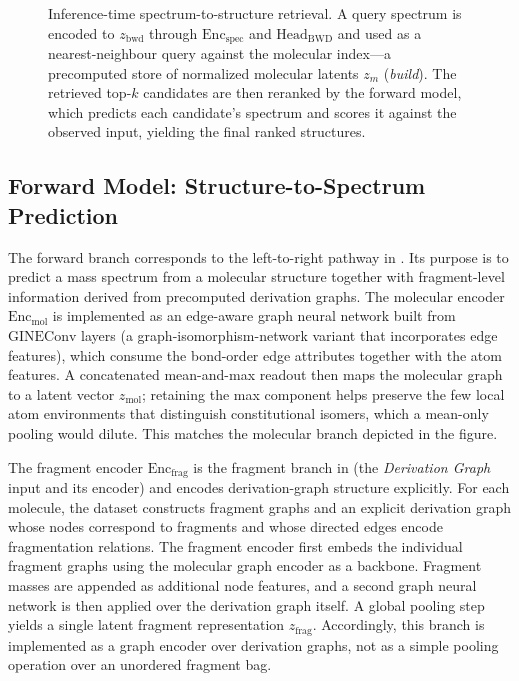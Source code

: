 \begin{figure}[H]
    \centering
    \resizebox{\textwidth}{!}{
        
    }
    \caption[Inference and retrieval]{
        Inference-time spectrum-to-structure retrieval.
        A query spectrum is encoded to $z_{\mathrm{bwd}}$ through $\text{Enc}_{\mathrm{spec}}$ and $\text{Head}_{\mathrm{BWD}}$ and used as a nearest-neighbour query against the molecular index---a precomputed store of normalized molecular latents $z_m$ (\emph{build}).
        The retrieved top-$k$ candidates are then reranked by the forward model, which predicts each candidate's spectrum and scores it against the observed input, yielding the final ranked structures.
    }
    \label{fig:ml-architecture-inference}
\end{figure}




\subsection{Forward Model: Structure-to-Spectrum Prediction}
\label{sec:forward-model}

The forward branch corresponds to the left-to-right pathway in .
Its purpose is to predict a mass spectrum from a molecular structure together with fragment-level information derived from precomputed derivation graphs.
The molecular encoder $\mathrm{Enc}_{\mathrm{mol}}$ is implemented as an edge-aware graph neural network built from $\mathrm{GINEConv}$ layers (a graph-isomorphism-network variant that incorporates edge features), which consume the bond-order edge attributes together with the atom features.
A concatenated mean-and-max readout then maps the molecular graph to a latent vector $z_{\mathrm{mol}}$; retaining the max component helps preserve the few local atom environments that distinguish constitutional isomers, which a mean-only pooling would dilute.
This matches the molecular branch depicted in the figure.

The fragment encoder $\mathrm{Enc}_{\mathrm{frag}}$ is the fragment branch in  (the \emph{Derivation Graph} input and its encoder) and encodes derivation-graph structure explicitly.
For each molecule, the dataset constructs fragment graphs and an explicit derivation graph whose nodes correspond to fragments and whose directed edges encode fragmentation relations.
The fragment encoder first embeds the individual fragment graphs using the molecular graph encoder as a backbone.
Fragment masses are appended as additional node features, and a second graph neural network is then applied over the derivation graph itself.
A global pooling step yields a single latent fragment representation $z_{\mathrm{frag}}$.
Accordingly, this branch is implemented as a graph encoder over derivation graphs, not as a simple pooling operation over an unordered fragment bag.

